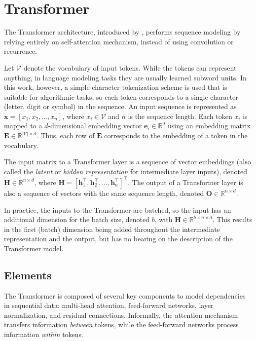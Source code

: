 \section{Transformer}\label{sec:transformer_arch}

The Transformer architecture, introduced by \textcite{vaswani_attention_2017}, performs sequence modeling by relying entirely on self-attention mechanism, instead of using convolution or recurrence.

Let $\mathcal{V}$ denote the vocabulary of input tokens. While the tokens can represent anything, in language modeling tasks they are usually learned subword units. In this work, however, a simple character tokenization scheme is used that is suitable for algorithmic tasks, so each token corresponds to a single character (letter, digit or symbol) in the sequence. An input sequence is represented as $\mathbf{x} = [x_1, x_2, \dots, x_n]$, where $x_i \in \mathcal{V}$ and $n$ is the sequence length. Each token $x_i$ is mapped to a $d$-dimensional embedding vector $\mathbf{e}_i \in \mathbb{R}^d$ using an embedding matrix $\mathbf{E} \in \mathbb{R}^{|\mathcal{V}| \times d}$. Thus, each row of $\mathbf{E}$ corresponds to the embedding of a token in the vocabulary.

The input matrix to a Transformer layer is a sequence of vector embeddings (also called the \emph{latent} or \emph{hidden representation} for intermediate layer inputs), denoted $\mathbf{H} \in \mathbb{R}^{n \times d}$, where $\mathbf{H} = [\mathbf{h}_1^\top, \mathbf{h}_2^\top, \dots, \mathbf{h}_n^\top]^\top$. The output of a Transformer layer is also a sequence of vectors with the same sequence length, denoted $\mathbf{O} \in \mathbb{R}^{n \times d}$.

In practice, the inputs to the Transformer are batched, so the input has an additional dimension for the batch size, denoted $b$, with $\mathbf{H} \in \mathbb{R}^{b \times n \times d}$. This results in the first (batch) dimension being added throughout the intermediate representation and the output, but has no bearing on the description of the Transformer model.

\subsection{Elements}\label{subsec:elements_transformers}

The Transformer is composed of several key components to model dependencies in sequential data: multi-head attention, feed-forward networks, layer normalization, and residual connections. Informally, the attention mechanism transfers information \emph{between} tokens, while the feed-forward networks process information \emph{within} tokens.

